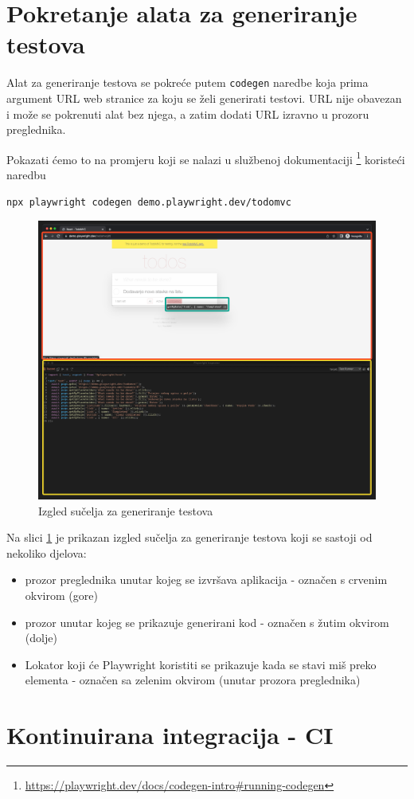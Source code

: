\section{Pokretanje alata za generiranje testova}

Alat za generiranje testova se pokreće putem \texttt{codegen} naredbe koja prima argument URL web stranice za koju se želi generirati testovi.
URL nije obavezan i može se pokrenuti alat bez njega, a zatim dodati URL izravno u prozoru preglednika.

Pokazati ćemo to na promjeru koji se nalazi u službenoj dokumentaciji \footnote{\url{https://playwright.dev/docs/codegen-intro\#running-codegen}} koristeći naredbu
\begin{verbatim}
npx playwright codegen demo.playwright.dev/todomvc
\end{verbatim}
\begin{figure}[!h]\begin{center}
    \includegraphics[width=1\textwidth]{"img/codegenInterface"}
    \caption{Izgled sučelja za generiranje testova}\label{img:pwCodeGen}
\end{center}\end{figure}

Na slici \ref{img:pwCodeGen} je prikazan izgled sučelja za generiranje testova koji se sastoji od nekoliko djelova:
\begin{itemize}
    \item prozor preglednika unutar kojeg se izvršava aplikacija - označen s crvenim okvirom (gore)
    \item prozor unutar kojeg se prikazuje generirani kod - označen s žutim okvirom (dolje)
    \item Lokator koji će Playwright koristiti se prikazuje kada se stavi miš preko elementa - označen sa zelenim okvirom (unutar prozora preglednika)
\end{itemize}


\section{Kontinuirana integracija - CI}
